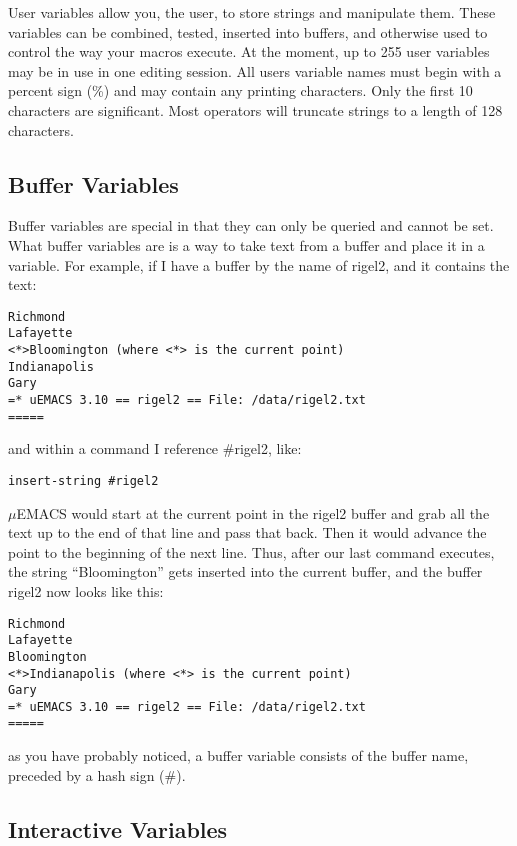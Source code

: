 User variables allow you, the user, to store strings and manipulate
them.  These variables can be combined, tested, inserted into buffers,
and otherwise used to control the way your macros execute. At the
moment, up to 255 user variables may be in use in one editing session.
All users variable names must begin with a percent sign (\%) and may
contain any printing characters. Only the first 10 characters are
significant. Most operators will truncate strings to a length of 128
characters.

\subsection{Buffer Variables}

Buffer variables are special in that they can only be queried and
cannot be set. What buffer variables are is a way to take text from a
buffer and place it in a variable. For example, if I have a buffer by
the name of rigel2, and it contains the text:

\begin{verbatim}
Richmond
Lafayette
<*>Bloomington (where <*> is the current point)
Indianapolis
Gary
=* uEMACS 3.10 == rigel2 == File: /data/rigel2.txt
=====
\end{verbatim}

and within a command I reference \#rigel2, like:

\begin{verbatim}
insert-string #rigel2
\end{verbatim}

$\mu$EMACS would start at the current point in the rigel2 buffer
and grab all the text up to the end of that line and pass that back.
Then it would advance the point to the beginning of the next line.
Thus, after our last command executes, the string ``Bloomington'' gets
inserted into the current buffer, and the buffer rigel2 now looks like
this:

\begin{verbatim}
Richmond
Lafayette
Bloomington
<*>Indianapolis (where <*> is the current point)
Gary
=* uEMACS 3.10 == rigel2 == File: /data/rigel2.txt
=====
\end{verbatim}

as you have probably noticed, a buffer variable consists of the buffer
name, preceded by a hash sign (\#).

\subsection{Interactive Variables}

